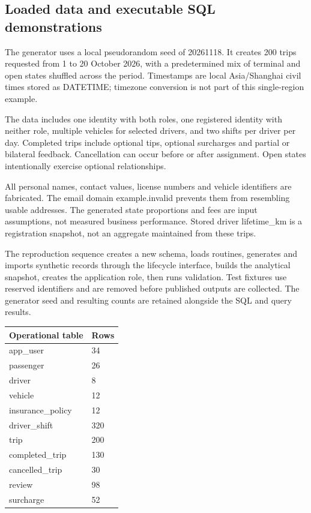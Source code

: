 \documentclass[11pt,a4paper]{article}
\begin{document}

\subsection{Loaded data and executable SQL demonstrations}
The generator uses a local pseudorandom seed of 20261118. It creates 200 trips requested from 1 to 20 October 2026, with a predetermined mix of terminal and open states shuffled across the period. Timestamps are local Asia/Shanghai civil times stored as DATETIME; timezone conversion is not part of this single-region example.

The data includes one identity with both roles, one registered identity with neither role, multiple vehicles for selected drivers, and two shifts per driver per day. Completed trips include optional tips, optional surcharges and partial or bilateral feedback. Cancellation can occur before or after assignment. Open states intentionally exercise optional relationships.

All personal names, contact values, license numbers and vehicle identifiers are fabricated. The email domain example.invalid prevents them from resembling usable addresses. The generated state proportions and fees are input assumptions, not measured business performance. Stored driver lifetime\_\allowbreak{}km is a registration snapshot, not an aggregate maintained from these trips.

The reproduction sequence creates a new schema, loads routines, generates and imports synthetic records through the lifecycle interface, builds the analytical snapshot, creates the application role, then runs validation. Test fixtures use reserved identifiers and are removed before published outputs are collected. The generator seed and resulting counts are retained alongside the SQL and query results.

\par\begingroup\small\noindent
\begin{tabularx}{\linewidth}{YY}
\toprule
Operational table & Rows\\\midrule
app\_\allowbreak{}user & 34\\
passenger & 26\\
driver & 8\\
vehicle & 12\\
insurance\_\allowbreak{}policy & 12\\
driver\_\allowbreak{}shift & 320\\
trip & 200\\
completed\_\allowbreak{}trip & 130\\
cancelled\_\allowbreak{}trip & 30\\
review & 98\\
surcharge & 52\\
\bottomrule
\end{tabularx}
\par\endgroup
\end{document}
